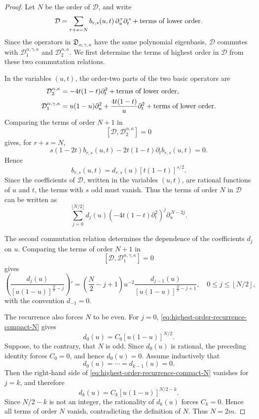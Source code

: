 \documentclass[reqno,10pt]{amsart}
\theoremstyle{plain}
\numberwithin{equation}{section}
\numberwithin{figure}{section}
\begin{document}
\begin{proof}
Let \(N\) be the order of \(\mathcal D\), and write
\[
\mathcal D
=
\sum_{r+s=N}
b_{r,s}(u,t)\,
\partial_u^{\,r}\partial_t^{\,s}
+
\textup{terms of lower order}.
\]
Since the operators in \(\mathfrak D_{\alpha,\gamma,\kappa}\) have the
same polynomial eigenbasis, \(\mathcal D\) commutes with
\(\mathcal D_1^{\alpha,\gamma,\kappa}\) and
\(\mathcal D_2^{\alpha,\kappa}\). We first determine the terms of highest
order in \(\mathcal D\) from these two commutation relations.

In the variables \((u,t)\), the order-two parts of the two basic
operators are
\begin{align*}
\mathcal D_2^{\alpha,\kappa}
&=
-4t(1-t)\partial_t^2
+
\textup{terms of lower order},\\
\mathcal D_1^{\alpha,\gamma,\kappa}
&=
u(1-u)\partial_u^2
+
\frac{4t(1-t)}{u}\partial_t^2
+
\textup{terms of lower order}.
\end{align*}
Comparing the terms of order \(N+1\) in
\[
[\mathcal D,\mathcal D_2^{\alpha,\kappa}]=0
\]
gives, for \(r+s=N\),
\[
s(1-2t)b_{r,s}(u,t)
-
2t(1-t)\partial_t b_{r,s}(u,t)
=
0.
\]
Hence
\[
b_{r,s}(u,t)
=
d_{r,s}(u)[t(1-t)]^{s/2}.
\]
Since the coefficients of \(\mathcal D\), written in the variables
\((u,t)\), are rational functions of \(u\) and \(t\), the terms with
\(s\) odd must vanish. Thus the terms of order \(N\) in \(\mathcal D\)
can be written as
\begin{equation}\label{eq:D-highest-order-N}
\sum_{j=0}^{\lfloor N/2\rfloor}
d_j(u)
\left(-4t(1-t)\partial_t^2\right)^j
\partial_u^{\,N-2j}.
\end{equation}

The second commutation relation determines the dependence of the
coefficients \(d_j\) on \(u\). Comparing the terms of order \(N+1\) in
\[
[\mathcal D,\mathcal D_1^{\alpha,\gamma,\kappa}]=0
\]
gives
\begin{equation}\label{eq:highest-order-recurrence-compact-N}
\left(
\frac{d_j(u)}
{[u(1-u)]^{\frac{N}{2}-j}}
\right)'
=
\left(\frac{N}{2}-j+1\right)u^{-2}
\frac{d_{j-1}(u)}
{[u(1-u)]^{\frac{N}{2}-j+1}},
\quad
0\leq j\leq \left\lfloor N/2\right\rfloor,
\end{equation}
with the convention \(d_{-1}=0\).

The recurrence also forces \(N\) to be even. For \(j=0\),
\eqref{eq:highest-order-recurrence-compact-N} gives
\[
d_0(u)=C_0[u(1-u)]^{N/2}.
\]
Suppose, to the contrary, that \(N\) is odd. Since \(d_0(u)\) is
rational, the preceding identity forces \(C_0=0\), and hence
\(d_0(u)=0\). Assume inductively that
\[
d_0(u)=\cdots=d_{k-1}(u)=0.
\]
Then the right-hand side of
\eqref{eq:highest-order-recurrence-compact-N} vanishes for \(j=k\), and
therefore
\[
d_k(u)=C_k[u(1-u)]^{N/2-k}.
\]
Since \(N/2-k\) is not an integer, the rationality of \(d_k(u)\) forces
\(C_k=0\). Hence all terms of order \(N\) vanish, contradicting the
definition of \(N\). Thus \(N=2m\).


\end{proof}
\end{document}
